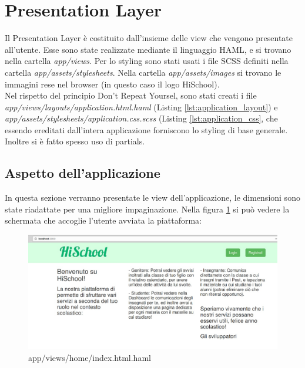 \documentclass[Lau, binding=0.6cm, oneside]{sapthesis}
\begin{document}
\section{Presentation Layer}

Il Presentation Layer è costituito dall'insieme delle view che vengono presentate all'utente. Esse sono state realizzate mediante il linguaggio HAML, e si trovano nella cartella \textit{app/views}. Per lo styling sono stati usati i file SCSS definiti nella cartella \textit{app/assets/stylesheets}. Nella cartella \textit{app/assets/images} si trovano le immagini rese nel browser (in questo caso il logo HiSchool).\\
Nel rispetto del principio Don't Repeat Yoursel, sono stati creati i file \textit{app/views/layouts/application.html.haml} (Listing \ref{lst:application_layout}) e \textit{app/assets/stylesheets/application.css.scss} (Listing \ref{lst:application_css}, che essendo ereditati dall'intera applicazione forniscono lo styling di base generale.\\
Inoltre si è fatto spesso uso di partials.

\lstset{language=HAML, , captionpos=b, frame=single}


\lstset{language=CSS, , captionpos=b, frame=single}


\subsection{Aspetto dell'applicazione}
In questa sezione verranno presentate le view dell'applicazione, le dimensioni sono state riadattate per una migliore impaginazione. Nella figura \ref{fig:home_page} si può vedere la schermata che accoglie l'utente avviata la piattaforma:

\begin{figure}[H]
	\centering
	\includegraphics[width=1\linewidth]{images/home_page} 
	\caption{app/views/home/index.html.haml}
	\label{fig:home_page}
\end{figure}
\end{document}

